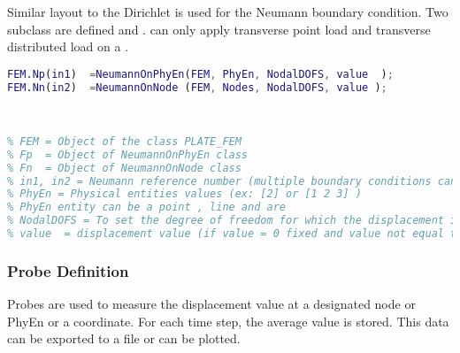 \documentclass[main.tex]{subfiles}
\begin{document}
Similar layout to the Dirichlet is used for the Neumann boundary condition. Two subclass are defined  and .   can only apply transverse point load and transverse distributed load on a . 

\begin{lstlisting}[language=matlab]
FEM.Np(in1)  =NeumannOnPhyEn(FEM, PhyEn, NodalDOFS, value  );
FEM.Nn(in2)  =NeumannOnNode (FEM, Nodes, NodalDOFS, value );

   
  
% FEM = Object of the class PLATE_FEM 
% Fp  = Object of NeumannOnPhyEn class 
% Fn  = Object of NeumannOnNode class 
% in1, in2 = Neumann reference number (multiple boundary conditions can be applied for same study)
% PhyEn = Physical entities values (ex: [2] or [1 2 3] )
% PhyEn entity can be a point , line and are
% NodalDOFS = To set the degree of freedom for which the displacement is imposed ( ex:[1 0 0] Dirichlet specially on w displacement)
% value  = displacement value (if value = 0 fixed and value not equal to 0 means imposed displacement) 
\end{lstlisting}

\subsubsection{Probe Definition}
Probes are used to measure the displacement value at a designated node or PhyEn or a coordinate. For each time step, the average value is stored. This data can be exported to a file or can be plotted. 
\end{document}
